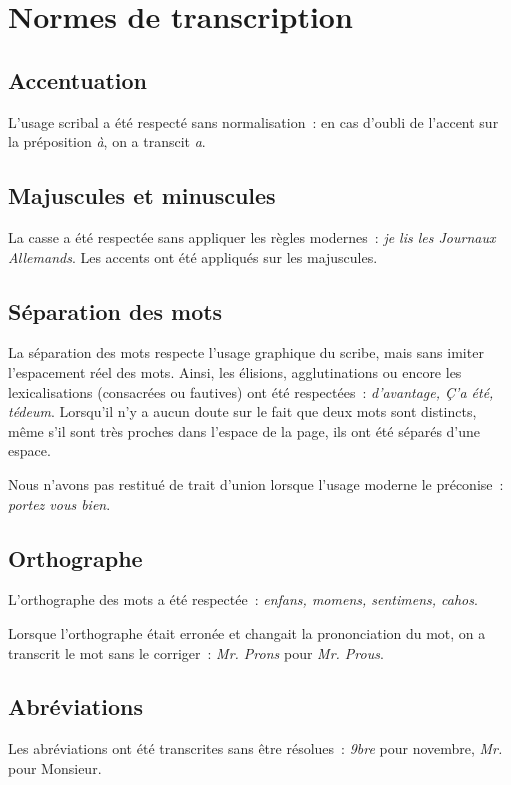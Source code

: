 \documentclass[a4paper,12pt,twoside]{book}
\begin{document}
	\chapter{Normes de transcription}
		\label{normes-trans}
	
		\section{Accentuation}
			L'usage scribal a été respecté sans normalisation~: en cas d'oubli de l'accent sur la préposition \textit{à}, on a transcit \textit{a}.
		
		\section{Majuscules et minuscules}
			La casse a été respectée sans appliquer les règles modernes~: \textit{je lis les Journaux Allemands}. Les accents ont été appliqués sur les majuscules.
		
		\section{Séparation des mots}
			La séparation des mots respecte l'usage graphique du scribe, mais sans imiter l'espacement réel des mots. Ainsi, les élisions, agglutinations ou encore les lexicalisations (consacrées ou fautives) ont été respectées~: \textit{d'avantage, Ç'a été, tédeum}. Lorsqu'il n'y a aucun doute sur le fait que deux mots sont distincts, même s'il sont très proches dans l'espace de la page, ils ont été séparés d'une espace.
		
			Nous n'avons pas restitué de trait d'union lorsque l'usage moderne le préconise~: \textit{portez vous bien}.
				
		\section{Orthographe}
			L'orthographe des mots a été respectée~: \textit{enfans, momens, sentimens, cahos}.
			
			Lorsque l'orthographe était erronée et changait la prononciation du mot, on a transcrit le mot sans le corriger~: \textit{Mr. Prons} pour \textit{Mr. Prous}.
		
		\section{Abréviations}
			Les abréviations ont été transcrites sans être résolues~: \textit{9bre} pour novembre, \textit{Mr.} pour Monsieur.
		
\end{document}
